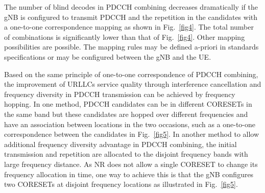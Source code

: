 \documentclass[conference,10pt]{IEEEtran}
\begin{document}
The number of blind decodes in PDCCH combining decreases dramatically if the gNB is configured to transmit PDCCH and the repetition in the candidates with a one-to-one correspondence mapping as shown in Fig.~\ref{fig4}. The total number of combinations is significantly lower than that of Fig.~\ref{fig4}. Other mapping possibilities are possible. The mapping rules may be defined a-priori in standards specifications or may be configured between the gNB and the UE. 

Based on the same principle of one-to-one correspondence of PDCCH
combining, the improvement of URLLC\textquotesingle s service quality through interference cancellation and frequency diversity in PDCCH transmission can be achieved by frequency hopping. In one method, PDCCH candidates can be in different CORESETs in the same band but these candidates are hopped over different frequencies and have an association between locations in the two occasions, such as a one-to-one correspondence between the candidates in Fig.~\ref{fig5}. In another method to allow additional frequency diversity advantage in PDCCH combining, the initial transmission and repetition are allocated to the disjoint frequency bands with large frequency distance. As NR does not allow a single CORESET to change its frequency allocation in time, one way to achieve this is that the gNB configures two CORESETs at disjoint frequency locations as illustrated in Fig.~\ref{fig5}.
\end{document}
